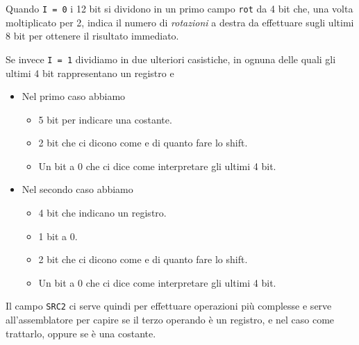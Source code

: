 Quando \verb|I = 0| i 12 bit si dividono in un primo campo \verb|rot| da 4 bit che, una volta
moltiplicato per 2, indica il numero di \emph{rotazioni} a destra da effettuare sugli ultimi 8 bit
per ottenere il risultato immediato.

Se invece \verb|I = 1| dividiamo in due ulteriori casistiche, in ognuna delle quali gli ultimi 4
bit rappresentano un registro e
\begin{itemize}
	\item Nel primo caso abbiamo
	      \begin{itemize}
		      \item 5 bit per indicare una costante.
		      \item 2 bit che ci dicono come e di quanto fare lo shift.
		      \item Un bit a 0 che ci dice come interpretare gli ultimi 4 bit.
	      \end{itemize}
	\item Nel secondo caso abbiamo
	      \begin{itemize}
		      \item 4 bit che indicano un registro.
		      \item 1 bit a 0.
		      \item 2 bit che ci dicono come e di quanto fare lo shift.
		      \item Un bit a 0 che ci dice come interpretare gli ultimi 4 bit.
	      \end{itemize}
\end{itemize}
Il campo \verb|SRC2| ci serve quindi per effettuare operazioni più complesse e serve
all'assemblatore per capire se il terzo operando è un registro, e nel caso come trattarlo, oppure
se è una costante.